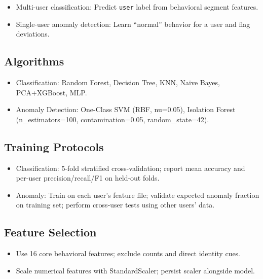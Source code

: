 \documentclass[
  12pt,
]{article}
\providecommand{\tightlist}{%
  \setlength{\itemsep}{0pt}\setlength{\parskip}{0pt}}
\begin{document}
\begin{itemize}
\tightlist
\item
  Multi-user classification: Predict \texttt{user} label from behavioral
  segment features.
\item
  Single-user anomaly detection: Learn ``normal'' behavior for a user
  and flag deviations.
\end{itemize}

\subsection{Algorithms}\label{algorithms}

\begin{itemize}
\tightlist
\item
  Classification: Random Forest, Decision Tree, KNN, Naive Bayes,
  PCA+XGBoost, MLP.
\item
  Anomaly Detection: One-Class SVM (RBF, nu=0.05), Isolation Forest
  (n\_estimators=100, contamination=0.05, random\_state=42).
\end{itemize}

\subsection{Training Protocols}\label{training-protocols}

\begin{itemize}
\tightlist
\item
  Classification: 5-fold stratified cross-validation; report mean
  accuracy and per-user precision/recall/F1 on held-out folds.
\item
  Anomaly: Train on each user's feature file; validate expected anomaly
  fraction on training set; perform cross-user tests using other users'
  data.
\end{itemize}

\subsection{Feature Selection}\label{feature-selection}

\begin{itemize}
\tightlist
\item
  Use 16 core behavioral features; exclude counts and direct identity
  cues.
\item
  Scale numerical features with StandardScaler; persist scaler alongside
  model.
\end{itemize}
\end{document}
